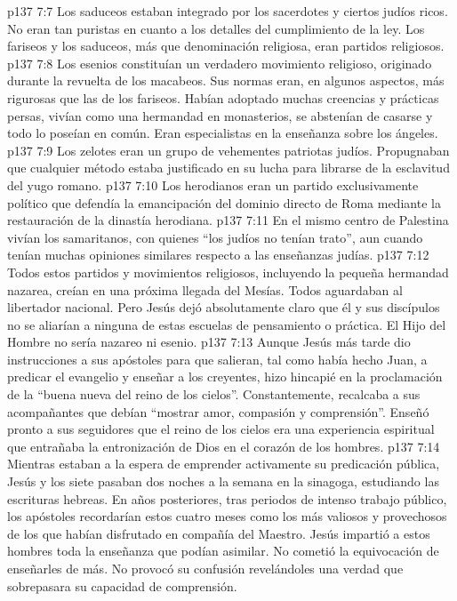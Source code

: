 \vs p137 7:7 \pc Los saduceos estaban integrado por los sacerdotes y ciertos judíos ricos. No eran tan puristas en cuanto a los detalles del cumplimiento de la ley. Los fariseos y los saduceos, más que denominación religiosa, eran partidos religiosos.
\vs p137 7:8 \pc Los esenios constituían un verdadero movimiento religioso, originado durante la revuelta de los macabeos. Sus normas eran, en algunos aspectos, más rigurosas que las de los fariseos. Habían adoptado muchas creencias y prácticas persas, vivían como una hermandad en monasterios, se abstenían de casarse y todo lo poseían en común. Eran especialistas en la enseñanza sobre los ángeles.
\vs p137 7:9 \pc Los zelotes eran un grupo de vehementes patriotas judíos. Propugnaban que cualquier método estaba justificado en su lucha para librarse de la esclavitud del yugo romano.
\vs p137 7:10 \pc Los herodianos eran un partido exclusivamente político que defendía la emancipación del dominio directo de Roma mediante la restauración de la dinastía herodiana.
\vs p137 7:11 \pc En el mismo centro de Palestina vivían los samaritanos, con quienes “los judíos no tenían trato”, aun cuando tenían muchas opiniones similares respecto a las enseñanzas judías.
\vs p137 7:12 \pc Todos estos partidos y movimientos religiosos, incluyendo la pequeña hermandad nazarea, creían en una próxima llegada del Mesías. Todos aguardaban al libertador nacional. Pero Jesús dejó absolutamente claro que él y sus discípulos no se aliarían a ninguna de estas escuelas de pensamiento o práctica. El Hijo del Hombre no sería nazareo ni esenio.
\vs p137 7:13 Aunque Jesús más tarde dio instrucciones a sus apóstoles para que salieran, tal como había hecho Juan, a predicar el evangelio y enseñar a los creyentes, hizo hincapié en la proclamación de la “buena nueva del reino de los cielos”. Constantemente, recalcaba a sus acompañantes que debían “mostrar amor, compasión y comprensión”. Enseñó pronto a sus seguidores que el reino de los cielos era una experiencia espiritual que entrañaba la entronización de Dios en el corazón de los hombres.
\vs p137 7:14 Mientras estaban a la espera de emprender activamente su predicación pública, Jesús y los siete pasaban dos noches a la semana en la sinagoga, estudiando las escrituras hebreas. En años posteriores, tras periodos de intenso trabajo público, los apóstoles recordarían estos cuatro meses como los más valiosos y provechosos de los que habían disfrutado en compañía del Maestro. Jesús impartió a estos hombres toda la enseñanza que podían asimilar. No cometió la equivocación de enseñarles de más. No provocó su confusión revelándoles una verdad que sobrepasara su capacidad de comprensión.
